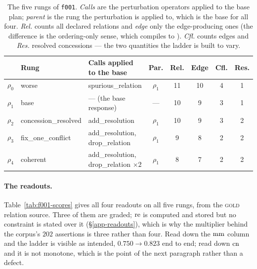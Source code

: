 \begin{table}[htbp]
\centering\small
\caption{The five rungs of \texttt{f001}. \emph{Calls} are the perturbation operators applied to the
  base plan; \emph{parent} is the rung the perturbation is applied to, which is the base for all four.
  \emph{Rel.} counts all declared relations and \emph{edge} only the edge-producing ones (the
  difference is the ordering-only sense, which compiles to ).
  \emph{Cfl.} counts \con{} edges and \emph{Res.} resolved concessions --- the two quantities
  the ladder is built to vary.}
\label{tab:f001-rungs}
\setlength{\tabcolsep}{4pt}
\begin{tabular}{@{}llp{4.1cm}ccccc@{}}
\toprule
& Rung & Calls applied to the base & Par. & Rel. & Edge & Cfl. & Res. \\
\midrule
$\rho_0$ & \textsf{worse}   & \textsf{spurious\_relation} & $\rho_1$ & 11 & 10 & 4 & 1 \\
$\rho_1$ & \textsf{base}    & --- (the base response)     & ---      & 10 &  9 & 3 & 1 \\
$\rho_2$ & \textsf{concession\_resolved} & \textsf{add\_resolution} & $\rho_1$ & 10 & 9 & 3 & 2 \\
$\rho_3$ & \textsf{fix\_one\_conflict}   & \textsf{add\_resolution}, \textsf{drop\_relation} & $\rho_1$ & 9 & 8 & 2 & 2 \\
$\rho_4$ & \textsf{coherent} & \textsf{add\_resolution}, \textsf{drop\_relation} $\times 2$ & $\rho_1$ & 8 & 7 & 2 & 2 \\
\bottomrule
\end{tabular}
\end{table}

\paragraph{The readouts.} Table~\ref{tab:f001-scores} gives all four readouts on all five rungs, from
the \textsc{gold} relation source. Three of them are graded; $\mathrm{re}$ is computed and stored but no
constraint is stated over it (\S\ref{app-readouts}), which is why the multiplier behind the corpus's
$202$ assertions is three rather than four. Read down the $\mathrm{mm}$ column and the ladder is visible as
intended, $0.750 \to 0.823$ end to end; read down $\mathrm{cn}$ and it is not monotone, which is the point of
the next paragraph rather than a defect.

